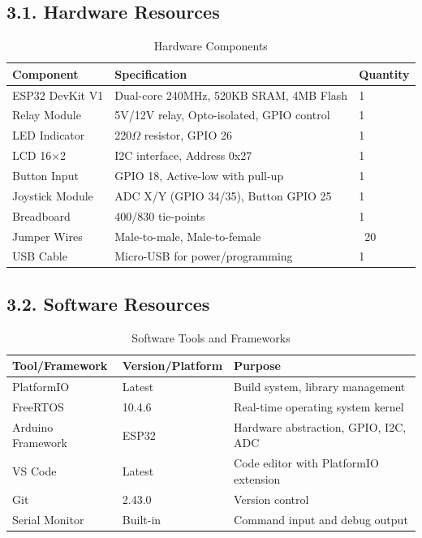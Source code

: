 \documentclass[12pt]{article}
\begin{document}
\subsection*{3.1. Hardware Resources}

\begin{table}[H]
	\centering
	\caption{Hardware Components}
	\label{tab:hardware-resources}
	\begin{tabular}{|l|l|l|}
		\hline
		\textbf{Component} & \textbf{Specification} & \textbf{Quantity} \\
		\hline
		ESP32 DevKit V1 & Dual-core 240MHz, 520KB SRAM, 4MB Flash & 1 \\
		\hline
		Relay Module & 5V/12V relay, Opto-isolated, GPIO control & 1 \\
		\hline
		LED Indicator & 220$\Omega$ resistor, GPIO 26 & 1 \\		\hline
		LCD 16×2 & I2C interface, Address 0x27 & 1 \\
		\hline
		Button Input & GPIO 18, Active-low with pull-up & 1 \\
		\hline
		Joystick Module & ADC X/Y (GPIO 34/35), Button GPIO 25 & 1 \\
		\hline
		Breadboard & 400/830 tie-points & 1 \\
		\hline
		Jumper Wires & Male-to-male, Male-to-female & ~20 \\
		\hline
		USB Cable & Micro-USB for power/programming & 1 \\
		\hline
	\end{tabular}
\end{table}

\subsection*{3.2. Software Resources}

\begin{table}[H]
	\centering
	\caption{Software Tools and Frameworks}
	\label{tab:software-resources}
	\begin{tabular}{|l|l|l|}
		\hline
		\textbf{Tool/Framework} & \textbf{Version/Platform} & \textbf{Purpose} \\
		\hline
		PlatformIO & Latest & Build system, library management \\
		\hline
		FreeRTOS & 10.4.6 & Real-time operating system kernel \\
		\hline
		Arduino Framework & ESP32 & Hardware abstraction, GPIO, I2C, ADC \\
		\hline
		VS Code & Latest & Code editor with PlatformIO extension \\
		\hline
		Git & 2.43.0 & Version control \\
		\hline
		Serial Monitor & Built-in & Command input and debug output \\
		\hline
	\end{tabular}
\end{table}
\end{document}
